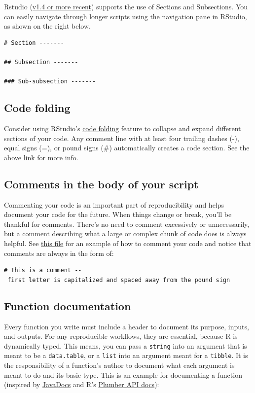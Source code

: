 \documentclass[
]{book}
\begin{document}
Rstudio (\href{https://blog.rstudio.com/2020/12/02/rstudio-v1-4-preview-little-things/}{v1.4 or more recent}) supports the use of Sections and Subsections. You can easily navigate through longer scripts using the navigation pane in RStudio, as shown on the right below.

\begin{verbatim}
# Section -------

## Subsection -------

### Sub-subsection -------
\end{verbatim}

\subsection{Code folding}\label{code-folding}

Consider using RStudio's \href{https://support.rstudio.com/hc/en-us/articles/200484568-Code-Folding-and-Sections}{code folding} feature to collapse and expand different sections of your code. Any comment line with at least four trailing dashes (-), equal signs (=), or pound signs (\#) automatically creates a code section. See the above link for more info.

\subsection{Comments in the body of your script}\label{comments-in-the-body-of-your-script}

Commenting your code is an important part of reproducibility and helps document your code for the future. When things change or break, you'll be thankful for comments. There's no need to comment excessively or unnecessarily, but a comment describing what a large or complex chunk of code does is always helpful. See \href{https://github.com/kmishra9/Flu-Absenteeism/blob/master/Master's\%20Thesis\%20-\%20Spatial\%20Epidemiology\%20of\%20Influenza/1b\%20-\%20Map-Management.R}{this file} for an example of how to comment your code and notice that comments are always in the form of:

\texttt{\#\ This\ is\ a\ comment\ -\/-\ first\ letter\ is\ capitalized\ and\ spaced\ away\ from\ the\ pound\ sign}

\subsection{Function documentation}\label{function-documentation}

Every function you write must include a header to document its purpose, inputs, and outputs. For any reproducible workflows, they are essential, because R is dynamically typed. This means, you can pass a \texttt{string} into an argument that is meant to be a \texttt{data.table}, or a \texttt{list} into an argument meant for a \texttt{tibble}. It is the responsibility of a function's author to document what each argument is meant to do and its basic type. This is an example for documenting a function (inspired by \href{https://www.oracle.com/technetwork/java/javase/documentation/index-137868.html\#format}{JavaDocs} and R's \href{https://blog.rstudio.com/2018/10/23/rstudio-1-2-preview-plumber-integration/}{Plumber API docs}):
\end{document}
